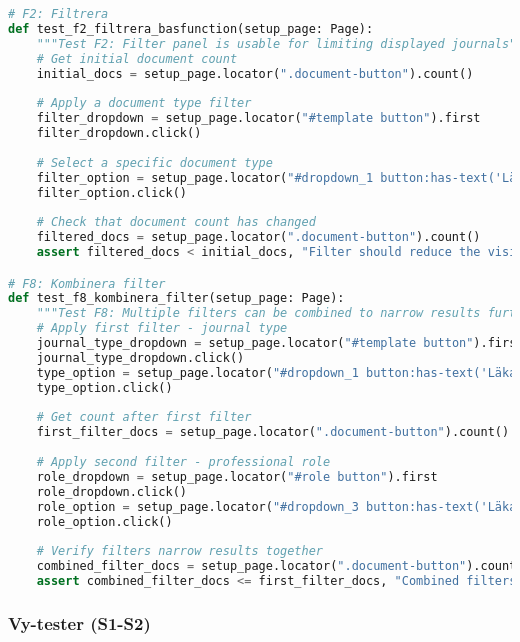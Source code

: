 \begin{lstlisting}[language=python]
# F2: Filtrera
def test_f2_filtrera_basfunction(setup_page: Page):
    """Test F2: Filter panel is usable for limiting displayed journals"""
    # Get initial document count
    initial_docs = setup_page.locator(".document-button").count()
    
    # Apply a document type filter
    filter_dropdown = setup_page.locator("#template button").first
    filter_dropdown.click()
    
    # Select a specific document type
    filter_option = setup_page.locator("#dropdown_1 button:has-text('Läkaranteckning')").first
    filter_option.click()
    
    # Check that document count has changed
    filtered_docs = setup_page.locator(".document-button").count()
    assert filtered_docs < initial_docs, "Filter should reduce the visible documents"

# F8: Kombinera filter
def test_f8_kombinera_filter(setup_page: Page):
    """Test F8: Multiple filters can be combined to narrow results further"""
    # Apply first filter - journal type
    journal_type_dropdown = setup_page.locator("#template button").first
    journal_type_dropdown.click()
    type_option = setup_page.locator("#dropdown_1 button:has-text('Läkaranteckning')").first
    type_option.click()
    
    # Get count after first filter
    first_filter_docs = setup_page.locator(".document-button").count()
    
    # Apply second filter - professional role
    role_dropdown = setup_page.locator("#role button").first
    role_dropdown.click()
    role_option = setup_page.locator("#dropdown_3 button:has-text('Läkare')").first
    role_option.click()
    
    # Verify filters narrow results together
    combined_filter_docs = setup_page.locator(".document-button").count()
    assert combined_filter_docs <= first_filter_docs, "Combined filters should narrow results further"
\end{lstlisting}

\subsubsection{Vy-tester (S1-S2)}

